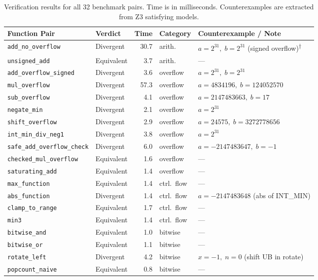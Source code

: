 \documentclass[11pt]{article}
\begin{document}
\begin{table}[H]
\centering
\caption{Verification results for all 32 benchmark pairs. Time is in milliseconds. Counterexamples are extracted from Z3 satisfying models.}
\label{tab:results}
\small
\begin{tabular}{@{}llrlp{5.5cm}@{}}
\toprule
Function Pair & Verdict & Time & Category & Counterexample / Note \\
\midrule
\texttt{add\_no\_overflow} & Divergent & 30.7 & arith. & $a = 2^{31},\; b = 2^{31}$ (signed overflow)\textsuperscript{$\dagger$} \\
\texttt{unsigned\_add} & Equivalent & 3.7 & arith. & --- \\
\texttt{add\_overflow\_signed} & Divergent & 3.6 & overflow & $a = 2^{31},\; b = 2^{31}$ \\
\texttt{mul\_overflow} & Divergent & 57.3 & overflow & $a = 4834196,\; b = 124052570$ \\
\texttt{sub\_overflow} & Divergent & 4.1 & overflow & $a = 2147483663,\; b = 17$ \\
\texttt{negate\_min} & Divergent & 2.1 & overflow & $a = 2^{31}$ \\
\texttt{shift\_overflow} & Divergent & 2.9 & overflow & $a = 24575,\; b = 3272778656$ \\
\texttt{int\_min\_div\_neg1} & Divergent & 3.8 & overflow & $a = 2^{31}$ \\
\texttt{safe\_add\_overflow\_check} & Divergent & 6.0 & overflow & $a = -2147483647,\; b = -1$ \\
\texttt{checked\_mul\_overflow} & Equivalent & 1.6 & overflow & --- \\
\texttt{saturating\_add} & Equivalent & 1.4 & overflow & --- \\
\texttt{max\_function} & Equivalent & 1.4 & ctrl.\ flow & --- \\
\texttt{abs\_function} & Divergent & 1.4 & ctrl.\ flow & $a = -2147483648$ (abs of INT\_MIN) \\
\texttt{clamp\_to\_range} & Equivalent & 1.7 & ctrl.\ flow & --- \\
\texttt{min3} & Equivalent & 1.4 & ctrl.\ flow & --- \\
\texttt{bitwise\_and} & Equivalent & 1.0 & bitwise & --- \\
\texttt{bitwise\_or} & Equivalent & 1.1 & bitwise & --- \\
\texttt{rotate\_left} & Divergent & 4.2 & bitwise & $x = -1,\; n = 0$ (shift UB in rotate) \\
\texttt{popcount\_naive} & Equivalent & 0.8 & bitwise & --- \\

\end{tabular}
\end{table}
\end{document}
